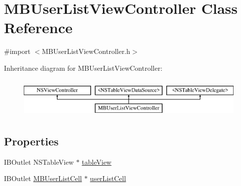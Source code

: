 \hypertarget{interface_m_b_user_list_view_controller}{\section{M\-B\-User\-List\-View\-Controller Class Reference}
\label{interface_m_b_user_list_view_controller}
}


{\ttfamily \#import $<$M\-B\-User\-List\-View\-Controller.\-h$>$}

Inheritance diagram for M\-B\-User\-List\-View\-Controller\-:\begin{figure}[H]
\begin{center}
\leavevmode
\includegraphics[height=2.000000cm]{interface_m_b_user_list_view_controller}
\end{center}
\end{figure}
\subsection*{Properties}
\begin{DoxyCompactItemize}
\item 
I\-B\-Outlet N\-S\-Table\-View $\ast$ \hyperlink{interface_m_b_user_list_view_controller_af20acd3235289aa79700f2872caa1d36}{table\-View}
\item 
I\-B\-Outlet \hyperlink{interface_m_b_user_list_cell}{M\-B\-User\-List\-Cell} $\ast$ \hyperlink{interface_m_b_user_list_view_controller_ad1ca66d8a912734d65f3a50a8c7d867c}{user\-List\-Cell}
\end{DoxyCompactItemize}


